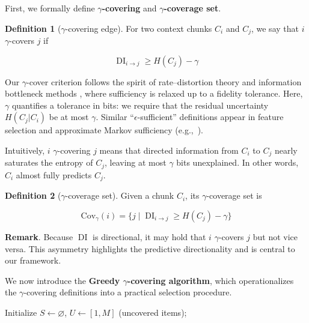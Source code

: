 \documentclass{article} %
\newcommand{\Cov}{\mathrm{Cov}}
\theoremstyle{definition}
\newtheorem{definition}{Definition}[section]
\DeclareMathOperator{\DI}{DI}
\begin{document}
First, we formally define \textbf{$\gamma$-covering} and \textbf{$\gamma$-coverage set}.

\begin{definition}[$\gamma$-covering edge]
For two context chunks $C_i$ and $C_j$, we say that $i$ $\gamma$-covers $j$ if

$$\DI_{i\to j} \ge H(C_j) - \gamma$$
\end{definition}

Our $\gamma$-cover criterion follows the spirit of rate–distortion theory \citep{shannon1959coding} and information bottleneck methods \citep{tishby1999information}, where sufficiency is relaxed up to a fidelity tolerance. Here, $\gamma$ quantifies a tolerance in bits: we require that the residual uncertainty $H(C_j|C_i)$ be at most $\gamma$. Similar ``$\epsilon$-sufficient'' definitions appear in feature selection and approximate Markov sufficiency (e.g.,~\citep{xu2017information}).

Intuitively, $i$ $\gamma$-covering $j$ means that directed information from $C_i$ to $C_j$ nearly saturates the entropy of $C_j$, leaving at most $\gamma$ bits unexplained. In other words, $C_i$ almost fully predicts $C_j$. 

\begin{definition}[$\gamma$-coverage set]
Given a chunk $C_i$, its $\gamma$-coverage set is

$$ \Cov_\gamma(i) = \{j \mid \DI_{i\to j} \ge H(C_j) - \gamma \}$$
   
\end{definition}

\textbf{Remark}. Because $\DI$ is directional, it may hold that $i$ $\gamma$-covers $j$ but not vice versa. This asymmetry highlights the predictive directionality and is central to our framework.

We now introduce the \textbf{Greedy $\gamma$-covering algorithm}, which operationalizes the $\gamma$-covering definitions into a practical selection procedure.

\begin{algorithm}[h]
\caption{Greedy $\gamma$-covering}
\label{alg:g-cover}
Initialize $S \leftarrow \varnothing$, $U \leftarrow [1, M]$ (uncovered items);\\
\end{algorithm}
\end{document}
